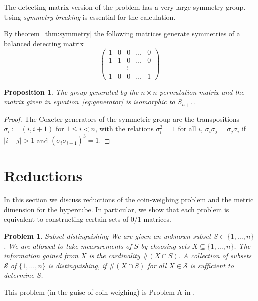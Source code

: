 \documentclass{article}
\renewcommand{\eqref}[1]{equation~\ref{eq:#1}}
\newcommand{\thmref}[1]{theorem~\ref{thm:#1}}
\newcommand{\cS}{\mathcal{S}}
\newtheorem{proposition}{Proposition}
\newtheorem{problem}{Problem}
\begin{document}
The detecting matrix version of the problem has a very large symmetry
group. Using \emph{symmetry breaking} is essential for the
calculation.

By \thmref{symmetry} the following matrices generate symmetries of a
balanced detecting matrix
\begin{equation}
  \label{eq:generator}
  \begin{pmatrix}
    1 & 0 & 0 & \dots & 0 \\
    1 & 1 & 0 & \dots & 0 \\
    & & \vdots \\
    1 & 0 & 0 & \dots & 1
  \end{pmatrix}
\end{equation}

\begin{proposition}
  The group generated by the $n \times n$ permutation matrix and the
  matrix given in \eqref{generator} is isomorphic to $S_{n+1}$.
\end{proposition}
\begin{proof}
  The Coxeter generators of the symmetric group are the transpositions
  $\sigma_i := (i, i+1)$ for $1 \le i < n$, with the relations
  $\sigma_i^2 = 1$ for all $i$, $\sigma_i \sigma_j = \sigma_j
  \sigma_i$ if $|i-j| > 1$ and $(\sigma_i \sigma_{i+1})^3 = 1$.
\end{proof}

\section{Reductions}
\label{sec:reductions}

In this section we discuss reductions of the coin-weighing problem and
the metric dimension for the hypercube.  In particular, we show that
each problem is equivalent to constructing certain sets of 0/1
matrices.

\begin{problem}{Subset distinguishing}
We are given an unknown subset $S \subset \{1, \dots, n\}$.  We are
allowed to take \emph{measurements} of $S$ by choosing sets $X
\subseteq \{1, \dots, n\}$.  The information gained from $X$ is the
cardinality $\# (X \cap S)$.  A collection of subsets $\cS$ of $\{1, \dots,
n\}$ is \emph{distinguishing}, if $\# (X \cap S)$ for all $X \in \cS$
is sufficient to determine $S$.
\end{problem}

This problem (in the guise of coin weighing) is Problem A in
\cite{erdos1963two}.
\end{document}
